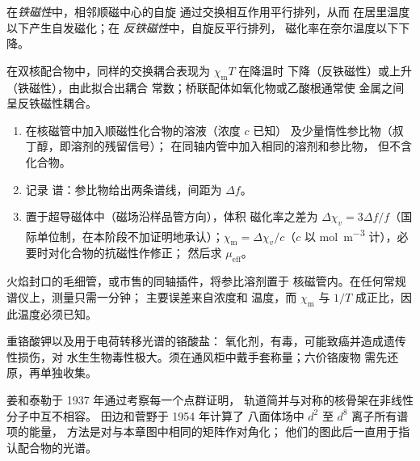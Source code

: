 \begin{definition}[协同磁性]\label{def:b3:complex-spectra-magnetism:cooperative}
在\emph{铁磁性}中，相邻顺磁中心的自旋
通过交换相互作用平行排列，从而
在居里温度以下产生自发磁化；在
\emph{反铁磁性}中，自旋反平行排列，
磁化率在奈尔温度以下下降。
\end{definition}

在双核配合物中，同样的交换耦合表现为 $\chi_{\mathrm m}T$ 在降温时
下降（反铁磁性）或上升（铁磁性），由此拟合出耦合
常数；桥联配体如氧化物或乙酸根通常使
金属之间呈反铁磁性耦合。

\begin{method}[用埃文斯方法测定磁矩]\label{met:b3:complex-spectra-magnetism:evans}
\begin{enumerate}
  \item 在核磁管中加入顺磁性化合物的溶液（浓度 $c$ 已知）
        及少量惰性参比物（叔丁醇，即溶剂的残留信号）；
        在同轴内管中加入相同的溶剂和参比物，
        但不含化合物。
  \item 记录  谱：参比物给出两条谱线，间距为 $\Delta f$。
  \item 置于超导磁体中（磁场沿样品管方向），体积
        磁化率之差为 $\Delta\chi_v = 3\Delta f/f$（国际单位制，在本阶段不加证明地承认）；$\chi_{\mathrm m} = \Delta\chi_v/c$（$c$ 以
        \unit{mol.m^{-3}} 计），必要时对化合物的抗磁性作修正；
        然后求 $\mu_{\mathrm{eff}}$。
\end{enumerate}
\end{method}

\begin{inthelab}[一次埃文斯测量]
火焰封口的毛细管，或市售的同轴插件，将参比溶剂置于
核磁管内。在任何常规谱仪上，测量只需一分钟；
主要误差来自浓度和
温度，而 $\chi_{\mathrm m}$ 与 $1/T$ 成正比，因此温度必须已知。
\end{inthelab}

\begin{safety}{}
重铬酸钾以及用于电荷转移光谱的铬酸盐：
氧化剂，有毒，可能致癌并造成遗传性损伤，对
水生生物毒性极大。须在通风柜中戴手套称量；六价铬废物
需先还原，再单独收集。
\end{safety}

\begin{history}
姜和泰勒于 1937 年通过考察每一个点群证明，
轨道简并与对称的核骨架在非线性分子中互不相容。
田边和菅野于 1954 年计算了
八面体场中 $d^2$ 至 $d^8$ 离子所有谱项的能量，
方法是对与本章图中相同的矩阵作对角化；
他们的图此后一直用于指认配合物的光谱。
\end{history}

